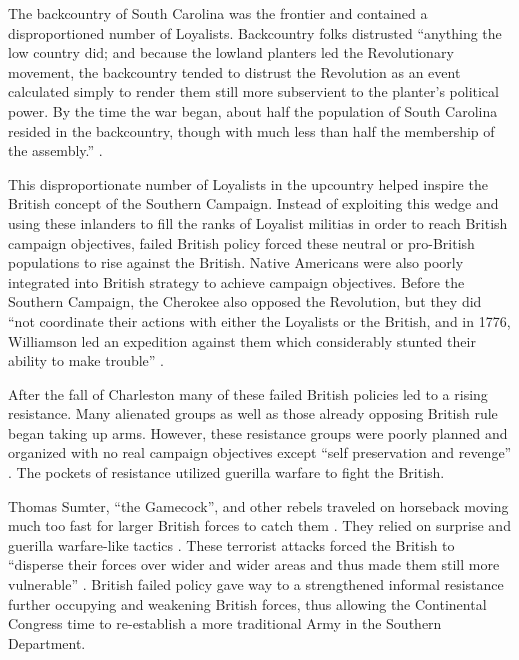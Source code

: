 The backcountry of South Carolina was the frontier and contained a
disproportioned number of Loyalists.  Backcountry folks distrusted “anything the
low country did; and because the lowland planters led the Revolutionary
movement, the backcountry tended to distrust the Revolution as an event
calculated simply to render them still more subservient to the planter’s
political power.  By the time the war began, about half the population of South
Carolina resided in the backcountry, though with much less than half the
membership of the assembly.'' \cite[p.11]{weigley_partisan_1970}.  

This disproportionate number of Loyalists in the upcountry helped inspire the
British concept of the Southern Campaign.  Instead of exploiting this wedge and
using these inlanders to fill the ranks of Loyalist militias in order to reach
British campaign objectives, failed British policy forced these neutral or
pro-British populations to rise against the British.  Native Americans were also
poorly integrated into British strategy to achieve campaign objectives.  Before
the Southern Campaign, the Cherokee also opposed the Revolution, but they did
``not coordinate their actions with either the Loyalists or the British, and in
1776, Williamson led an expedition against them which considerably stunted their
ability to make trouble” \cite[p.12]{weigley_partisan_1970}.

After the fall of Charleston many of these failed British policies led to a
rising resistance.  Many alienated groups as well as those already opposing
British rule began taking up arms.  However, these resistance groups were poorly
planned and organized with no real campaign objectives except  “self
preservation and revenge” \cite[p.14]{weigley_partisan_1970}.  The pockets of resistance utilized
guerilla warfare to fight the British.  

Thomas Sumter, “the Gamecock”, and other rebels traveled on horseback moving
much too fast for larger British forces to catch them
\cite[p.15]{weigley_partisan_1970}.  They relied on surprise and guerilla
warfare-like tactics \cite[p.15]{weigley_partisan_1970}.  These terrorist
attacks forced the British to “disperse their forces over wider and wider areas
and thus made them still more vulnerable” \cite[p.16]{weigley_partisan_1970}.
British failed policy gave way to a strengthened informal resistance further
occupying and weakening British forces, thus allowing the Continental Congress
time to re-establish a more traditional Army in the Southern Department.

